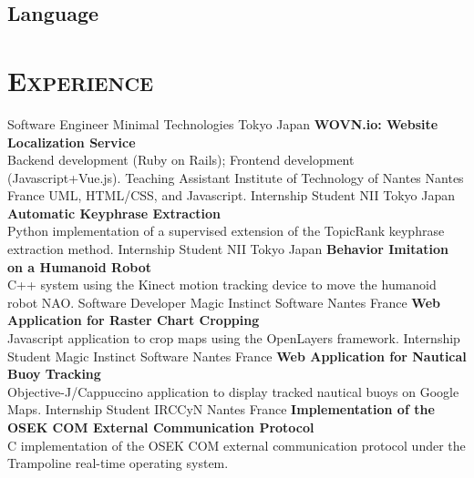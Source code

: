 \documentclass[10pt, a4paper]{moderncv}
\begin{document}
    \subsection{Language}

  \section{\textsc{Experience}}
            {Software Engineer}
            {Minimal Technologies}
            {Tokyo}
            {Japan}
            {\textbf{WOVN.io: Website Localization Service}\\
             Backend development (Ruby on Rails); Frontend development (Javascript+Vue.js).}
            {Teaching Assistant}                %
            {Institute of Technology of Nantes} %
            {Nantes}                            %
            {France}                            %
            {UML, HTML/CSS, and Javascript.}    %
            {Internship Student}
            {NII}
            {Tokyo}
            {Japan}
            {\textbf{Automatic Keyphrase Extraction}\\
             Python implementation of a supervised extension of the TopicRank
             keyphrase extraction method.}
            {Internship Student}
            {NII}
            {Tokyo}
            {Japan}
            {\textbf{Behavior Imitation on a Humanoid Robot}\\
             C++ system using the Kinect motion tracking device to move the
             humanoid robot NAO.}
            {Software Developer}
            {Magic Instinct Software}
            {Nantes}
            {France}
            {\textbf{Web Application for Raster Chart Cropping}\\
             Javascript application to crop maps using the OpenLayers
             framework.}
            {Internship Student}
            {Magic Instinct Software}
            {Nantes}
            {France}
            {\textbf{Web Application for Nautical Buoy Tracking}\\
             Objective-J/Cappuccino application to display tracked nautical
             buoys on Google Maps.}
            {Internship Student}
            {IRCCyN}
            {Nantes}
            {France}
            {\textbf{Implementation of the OSEK COM External Communication
             Protocol}\\
             C implementation of the OSEK COM external communication protocol
             under the Trampoline real-time operating system.}

  
  
  \nocite{*}
\end{document}
